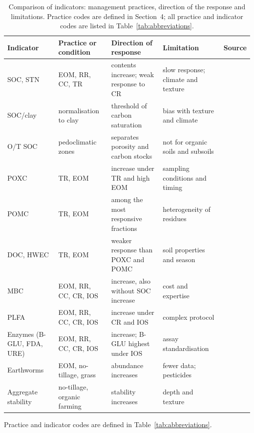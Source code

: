 \documentclass[english]{ai4science_ysda}
\begin{document}
\begin{table}[!htbp]
  \centering
  \caption{Comparison of indicators: management practices, direction of the
  response and limitations. Practice codes are defined in Section~4; all practice
  and indicator codes are listed in Table~\ref{tab:abbreviations}.}
  \label{tab:indicators}
  \small
  \setlength{\tabcolsep}{2pt}
  \renewcommand{\arraystretch}{0.85}
  \begin{tabular}{@{}>{\raggedright\arraybackslash}p{}
      >{\raggedright\arraybackslash}p{}
      >{\raggedright\arraybackslash}p{}
      >{\raggedright\arraybackslash}p{}
      >{\raggedright\arraybackslash}p{}@{}}
    \hline
    \textbf{Indicator} & \textbf{Practice or condition} &
    \textbf{Direction of response} & \textbf{Limitation} &
    \textbf{Source} \\
    \hline
    SOC, STN & EOM, RR, CC, TR & contents increase; weak response to CR & slow
    response; climate and texture & \cite{cusset2024} \\
    SOC/clay & normalisation to clay & threshold of carbon saturation & bias
    with texture and climate & \cite{feeney2024} \\
    O/T SOC & pedoclimatic zones & separates porosity and carbon stocks & not
    for organic soils and subsoils & \cite{feeney2024} \\
    POXC & TR, EOM & increase under TR and high EOM & sampling conditions and
    timing & \cite{bongiorno2019} \\
    POMC & TR, EOM & among the most responsive fractions & heterogeneity of
    residues & \cite{bongiorno2019} \\
    DOC, HWEC & TR, EOM & weaker response than POXC and POMC & soil properties
    and season & \cite{bongiorno2019} \\
    MBC & EOM, RR, CC, CR, IOS & increase, also without SOC increase & cost and
    expertise & \cite{cusset2024} \\
    PLFA & EOM, RR, CC, CR, IOS & increase under CR and IOS & complex protocol &
    \cite{cusset2024} \\
    Enzymes (B-GLU, FDA, URE) & EOM, RR, CC, CR, IOS & increase; B-GLU highest
    under IOS & assay standardisation & \cite{cusset2024,bhupenchandra2026} \\
    Earthworms & EOM, no-tillage, grass & abundance increases & fewer data;
    pesticides & \cite{bai2018} \\
    Aggregate stability & no-tillage, organic farming & stability increases &
    depth and texture & \cite{bai2018} \\
    \hline
  \end{tabular}

  \vspace{2pt}
  {\footnotesize Practice and indicator codes are defined in
  Table~\ref{tab:abbreviations}.\par}
\end{table}
\end{document}
